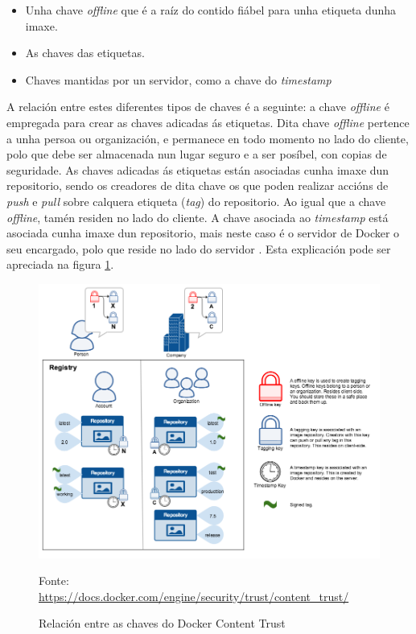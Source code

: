 \begin{itemize}
    \item Unha chave \textit{offline} que é a raíz do contido fiábel para unha etiqueta dunha imaxe.
    \item As chaves das etiquetas.
    \item Chaves mantidas por un servidor, como a chave do \textit{timestamp}\end{itemize}
    
A relación entre estes diferentes tipos de chaves é a seguinte: a chave \textit{offline} é empregada para crear as chaves adicadas ás etiquetas. Dita chave \textit{offline} pertence a unha persoa ou organización, e permanece en todo momento no lado do cliente, polo que debe ser almacenada nun lugar seguro e a ser posíbel, con copias de seguridade. As chaves adicadas ás etiquetas están asociadas cunha imaxe dun repositorio, sendo os creadores de dita chave os que poden realizar accións de \textit{push} e \textit{pull} sobre calquera etiqueta (\textit{tag}) do repositorio. Ao igual que a chave \textit{offline}, tamén residen no lado do cliente. A chave asociada ao \textit{timestamp} está asociada cunha imaxe dun repositorio, mais neste caso é o servidor de Docker o seu encargado, polo que reside no lado do servidor \cite{docker-content-trust}. Esta explicación pode ser apreciada na figura \ref{trust_components}. 

\begin{figure}
\centerline{\includegraphics[width=15cm]{figuras/trust_components.png}}
\caption{Relación entre as chaves do Docker Content Trust}
\small
\centerline{Fonte: \url{https://docs.docker.com/engine/security/trust/content_trust/}}
\label{trust_components}
\end{figure}

